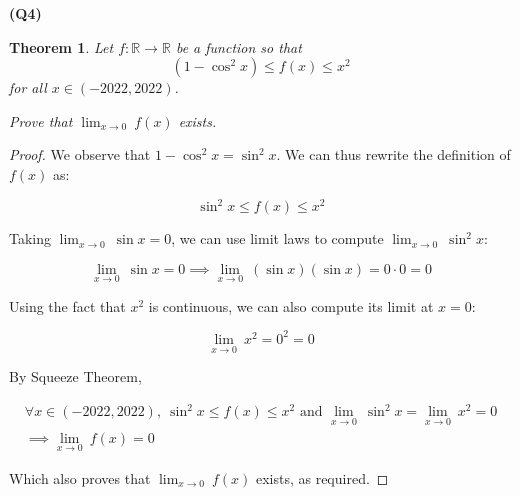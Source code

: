\documentclass[12pt, a4paper]{article}
\newcommand{\R}{\mathbb{R}}
\newcommand{\displim}[1]{\displaystyle{\lim_{#1}\:}}
\newcommand{\zerolim}{\displim{x \to 0}}
\newtheorem{theorem}{Theorem}
\begin{document}
\textbf{(Q4)}

\begin{theorem}
    Let $f \colon \R \to \R$ be a function so that
    \[
        (1 - \cos^2x) \leq f(x) \leq x^2
    \]
    for all $x \in (-2022, 2022)$.

    Prove that $\zerolim f(x)$ exists.
\end{theorem}

\begin{proof}
    We observe that $1 - \cos^2x = \sin^2x$. We can thus rewrite the definition of
    $f(x)$ as:

    \[
        \sin^2x \leq f(x) \leq x^2
    \]

    Taking $\zerolim \sin x = 0$, we can use limit laws to compute $\zerolim \sin^2x$:

    \[
        \zerolim \sin x = 0 \implies \zerolim (\sin x)(\sin x) = 0 \cdot 0 = 0
    \]

    Using the fact that $x^2$ is continuous, we can also compute its limit at $x = 0$:

    \[
        \zerolim x^2 = 0^2 = 0
    \]

    By Squeeze Theorem,

    \begin{gather*}
        \forall x \in (-2022, 2022),\: \sin^2x \leq f(x) \leq x^2 \text{ and } \zerolim \sin^2x = \zerolim x^2 = 0\\
        \implies \zerolim f(x) = 0
    \end{gather*}

    Which also proves that $\zerolim f(x)$ exists, as required.
\end{proof}
\end{document}
